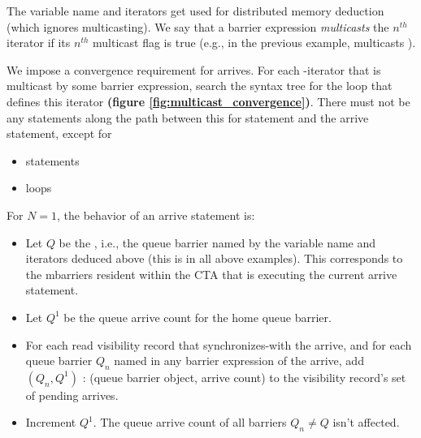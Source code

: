The variable name and  iterators get used for distributed memory deduction (which ignores multicasting).
We say that a barrier expression \textit{multicasts} the $n^{th}$ iterator if its $n^{th}$ multicast flag is true (e.g., in the previous example,  multicasts ).

\begin{figure*}[!b]

\caption{Illustration of mbarrier multicast convergence requirements} \label{fig:multicast_convergence}
\end{figure*}

\filbreak
{}

We impose a convergence requirement for arrives.
For each -iterator that is multicast by some barrier expression, search the syntax tree for the  loop that defines this iterator \textbf{(figure \ref{fig:multicast_convergence})}.
There must not be any statements along the path between this for statement and the arrive statement, except for
\begin{itemize}
  \item {} statements
  \filbreak
  \item {} loops
\end{itemize}

\filbreak
For $N=1$, the behavior of an arrive statement is:
\begin{itemize}
  \item Let $Q$ be the , i.e., the queue barrier named by the variable name and iterators deduced above (this is  in all above examples).
    This corresponds to the mbarriers resident within the CTA that is executing the current arrive statement.
  \filbreak
  \item Let $Q^1$ be the queue arrive count for the home queue barrier.
  \filbreak
  \item For each read visibility record that synchronizes-with the arrive, and for each queue barrier $Q_n$ named in any barrier expression of the arrive, add $(Q_n, Q^1)$ : (queue barrier object, arrive count) to the visibility record's set of pending arrives.
  \filbreak
  \item Increment $Q^1$.
    The queue arrive count of all barriers $Q_n \ne Q$ isn't affected.
\end{itemize}

